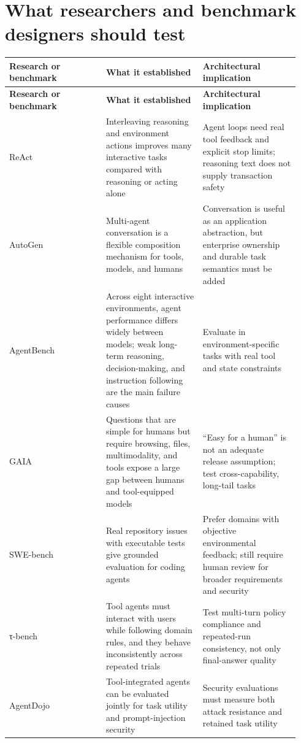 
\section{What researchers and benchmark designers should test}

\BookTableStart
\small
\begin{longtable}{@{}Y{0.3133\linewidth}Y{0.3133\linewidth}Y{0.3133\linewidth}@{}}
\color{white}\bfseries \textbf{Research or benchmark} & \color{white}\bfseries \textbf{What it established} & \color{white}\bfseries \textbf{Architectural implication} \\
\endfirsthead
{}
\color{white}\bfseries \textbf{Research or benchmark} & \color{white}\bfseries \textbf{What it established} & \color{white}\bfseries \textbf{Architectural implication} \\
\endhead
ReAct  & Interleaving reasoning and environment actions improves many interactive tasks compared with reasoning or acting alone & Agent loops need real tool feedback and explicit stop limits; reasoning text does not supply transaction safety \\
AutoGen  & Multi-agent conversation is a flexible composition mechanism for tools, models, and humans & Conversation is useful as an application abstraction, but enterprise ownership and durable task semantics must be added \\
AgentBench  & Across eight interactive environments, agent performance differs widely between models; weak long-term reasoning, decision-making, and instruction following are the main failure causes & Evaluate in environment-specific tasks with real tool and state constraints \\
GAIA  & Questions that are simple for humans but require browsing, files, multimodality, and tools expose a large gap between humans and tool-equipped models & “Easy for a human” is not an adequate release assumption; test cross-capability, long-tail tasks \\
SWE-bench  & Real repository issues with executable tests give grounded evaluation for coding agents & Prefer domains with objective environmental feedback; still require human review for broader requirements and security \\
τ-bench  & Tool agents must interact with users while following domain rules, and they behave inconsistently across repeated trials & Test multi-turn policy compliance and repeated-run consistency, not only final-answer quality \\
AgentDojo  & Tool-integrated agents can be evaluated jointly for task utility and prompt-injection security & Security evaluations must measure both attack resistance and retained task utility \\
\end{longtable}
\BookTableEnd

